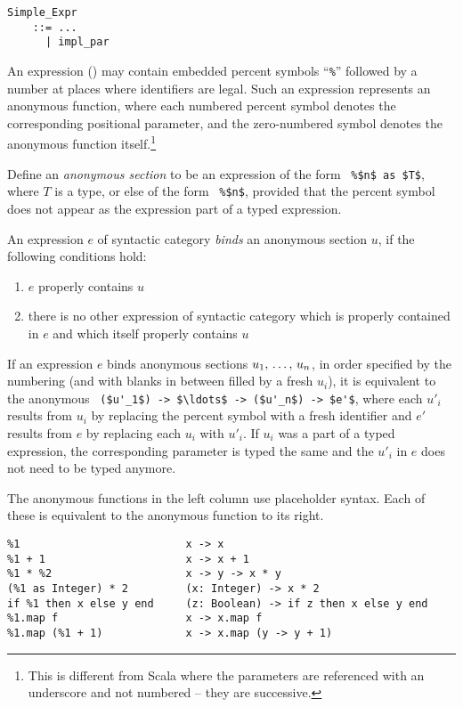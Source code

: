 \grammar\begin{lstlisting}
Simple_Expr 
    ::= ...
      | impl_par
\end{lstlisting}

An expression () may contain embedded percent symbols ``\lstinline!%!'' followed by a number at places where identifiers are legal. Such an expression represents an anonymous function, where each numbered percent symbol denotes the corresponding positional parameter, and the zero-numbered symbol denotes the anonymous function itself.\footnote{This is different from Scala where the parameters are referenced with an underscore and not numbered -- they are successive.}

Define an {\em anonymous section} to be an expression of the form ~\lstinline!%$n$ as $T$!, where $T$ is a type, or else of the form ~\lstinline!%$n$!, provided that the percent symbol does not appear as the expression part of a typed expression. 

An expression $e$ of syntactic category  {\em binds} an anonymous section $u$, if the following conditions hold:
\begin{enumerate}
  \item $e$ properly contains $u$
  \item there is no other expression of syntactic category  which is properly contained in $e$ and which itself properly contains $u$
\end{enumerate}

If an expression $e$ binds anonymous sections $u_1 ,\, \ldots ,\, u_n$, in order specified by the numbering (and with blanks in between filled by a fresh $u_i$), it is equivalent to the anonymous ~\lstinline!($u'_1$) -> $\ldots$ -> ($u'_n$) -> $e'$!, where each $u'_i$ results from $u_i$ by replacing the percent symbol with a fresh identifier and $e'$ results from $e$ by replacing each $u_i$ with $u'_i$. If $u_i$ was a part of a typed expression, the corresponding parameter is typed the same and the $u'_i$ in $e$ does not need to be typed anymore. 

\example The anonymous functions in the left column use placeholder syntax. Each of these is equivalent to the anonymous function to its right. 
\begin{lstlisting}
%1                          x -> x
%1 + 1                      x -> x + 1
%1 * %2                     x -> y -> x * y
(%1 as Integer) * 2         (x: Integer) -> x * 2
if %1 then x else y end     (z: Boolean) -> if z then x else y end
%1.map f                    x -> x.map f
%1.map (%1 + 1)             x -> x.map (y -> y + 1)
\end{lstlisting} 






